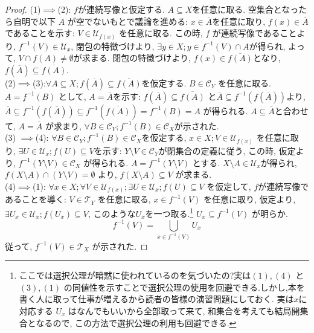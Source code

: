 \documentclass[dvipdfmx]{jbook}
\newcommand{\cl}[1]{\overline{ #1}  }
\theoremstyle{remark}
\theoremstyle{plain}
\begin{document}
\begin{proof}
	(1)$\implies$(2): $f$が連続写像と仮定する. $A \subseteq X$を任意に取る. 空集合となったら自明で以下 $A$ が空でないもとで議論を進める:
$x \in \cl{A}$を任意に取り,  $f(x) \in \cl{A}$であることを示す:
 $V \in \mathcal{U}_{f(x)}$ を任意に取る. 
 この時, $f$ が連続写像であることより, 
 $f^{-1}\left( V \right) \in \mathcal{U}_x$, 
 閉包の特徴づけより, 
 $\exists y \in X; y \in f^{-1}\left( V \right)\cap A$が得られ, 
 よって, $V \cap f(A) \neq \emptyset $が求まる. 
 閉包の特徴づけより, 
 $f(x) \in \cl{f(A)}$となり, $f\left( \cl{A} \right) \subseteq \cl{f\left( A \right) }$.\\
 	(2)$\implies$(3):$\forall A \subseteq X ; f\left( \cl{A} \right) \subseteq \cl{f\left( A \right) }$を仮定する. 
	$B \in \mathcal{C}_Y$ を任意に取る. 
	$A = f^{-1} \left( B \right) $ として, 
	$A = \cl{A}$を示す:
	 $ f\left( \cl{A} \right) \subseteq \cl{f\left( A \right) }  $ と$\cl{A} \subseteq f^{-1}\left( f(\cl{A}) \right)  $より,
	 $\cl{A} \subseteq f^{-1}\left( f(\cl{A}) \right) \subseteq f^{-1}\left( \cl{f\left( A \right) } \right)  = f ^{-1} \left( B \right) = A$ が得られる. 
	 $A \subseteq \cl{A}$と合わせて, $A = \cl{A}$ が求まり,
	 $\forall B \in \mathcal{C}_Y ; f^{-1}\left( B \right)  \in \mathcal{C}_X$が示された.\\
	 (3) $\implies$(4): $\forall B \in \mathcal{C}_Y; f^{-1}\left( B \right)  \in \mathcal{C}_X$を仮定する, 
	 $x \in X ; V \in \mathcal{U}_{f\left( x \right) }$ を任意に取り, $\exists U \in \mathcal{U}_x ; f\left( U \right) \subseteq V$を示す:
	 $Y \setminus V \in \mathcal{C}_Y$が閉集合の定義に従う, 
	 この時, 仮定より, $f^{-1}\left( Y\setminus V \right) \in \mathcal{C}_X$ が得られる. 
	 $A = f^{-1} \left( Y \setminus V \right) $ とする. 
	 $X\setminus A \in \mathcal{U}_x $が得られ, 
	 $f\left( X \setminus A \right) \cap \left( Y \setminus V \right) = \emptyset $ より, 
	 $f\left( X \setminus A \right) \subseteq V$ が求まる. \\
	(4)$\implies$(1): $\forall x \in X; \forall V \in \mathcal{U}_{f(x)};\exists U \in \mathcal{U}_x; f(U) \subseteq V $ を仮定して, $f$が連続写像であることを導く:
	 $V \in \mathcal{T}_Y$ を任意に取る, $x \in f^{-1}\left( V \right) $ を任意に取り, 
 仮定より,$\exists U_x \in \mathcal{U}_x ; f(U_x) \subseteq V$, このような$U_x$を一つ取る.\footnote{ここでは選択公理が暗黙に使われているのを気づいたの?実は$(1),(4)$ と $(3),(1)$ の同値性を示すことで選択公理の使用を回避できる.しかし,本を書く人に取って仕事が増えるから読者の皆様の演習問題にしておく. 実は$x$に対応する $U_x$ はなんでもいいから全部取って来て, 和集合を考えても結局開集合となるので, この方法で選択公理の利用も回避できる.} $U_x \subseteq f^{-1}\left( V \right) $ が明らか. 
	 $$
	 f^{-1}\left( V \right) = \bigcup_{x \in f^{-1}\left( V \right) } U_x
	 $$
	 従って, $f^{-1} \left( V \right) \in \mathcal{T}_X$ が示された.
\end{proof}
\end{document}
